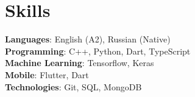 \documentclass[A4,11pt]{article}
\begin{document}

\section{Skills}
 \begin{itemize}[leftmargin=0.5cm, label={}]
    \small{\item{
     \textbf{Languages}{: English (A2), Russian (Native) } \\
     \textbf{Programming}{: C++, Python, Dart, TypeScript } \\
     \textbf{Machine Learning}{: Tensorflow, Keras } \\
     \textbf{Mobile}{: Flutter, Dart } \\
     \textbf{Technologies}{: Git, SQL, MongoDB } \\
    }}
 \end{itemize}
    
\end{document}
